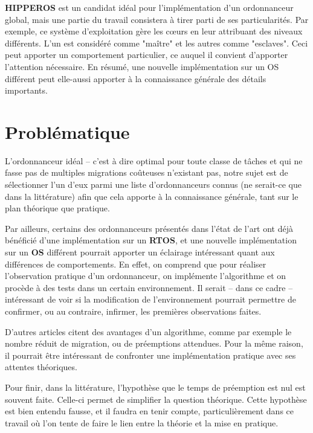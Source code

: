 \documentclass[11pt,a4paper,oneside]{report}
\begin{document}
	\textbf{HIPPEROS} est un candidat idéal pour l'implémentation d'un ordonnanceur 
	global, mais une partie du travail consistera à tirer parti de ses particularités. 
	Par exemple, ce système d'exploitation gère les c\oe{}urs en leur attribuant des 
	niveaux différents. L'un est considéré comme "maître" et les autres comme "esclaves". 
	Ceci peut apporter un comportement particulier, ce auquel il convient d'apporter 
	l'attention nécessaire. En résumé, une nouvelle implémentation sur un OS différent 
	peut elle-aussi apporter à la connaissance générale des détails importants.
	
	
	\section{Problématique}
	L'ordonnanceur idéal -- c'est à dire optimal pour toute classe de tâches et 
	qui ne fasse pas de multiples migrations coûteuses n'existant pas, 
	notre sujet est de sélectionner l'un d'eux parmi une liste 
	d'ordonnanceurs connus (ne serait-ce que dans la littérature) afin que cela apporte 
	à la connaissance générale, tant sur le plan théorique que pratique.\medskip
	
	Par ailleurs, certains des ordonnanceurs présentés dans l'état de l'art 
	ont déjà bénéficié d'une implémentation sur un \textbf{RTOS}, et une nouvelle 
	implémentation sur un \textbf{OS} différent pourrait apporter un éclairage intéressant quant 
	aux différences de comportements.
	En effet, on comprend que pour réaliser l'observation pratique d'un ordonnanceur, 
	on implémente l'algorithme et on procède à des tests dans un certain environnement. 
	Il serait -- dans ce cadre -- intéressant de voir si la modification de l'environnement 
	pourrait permettre de confirmer, ou au contraire, infirmer, les premières observations faites.
	
	
	D'autres articles citent des avantages d'un algorithme, comme par exemple 
	le nombre réduit de migration, ou de préemptions attendues. Pour la même raison, 
	il pourrait être intéressant de confronter une implémentation pratique avec ses attentes 
	théoriques.\medskip
	
	Pour finir, dans la littérature, l'hypothèse que le temps de préemption est nul 
	est souvent faite. Celle-ci permet de simplifier la question théorique. 
	Cette hypothèse est bien entendu fausse, et il faudra en tenir compte, 
	particulièrement dans ce travail où l'on tente de faire 
	le lien entre la théorie et la mise en pratique.\medskip
	
\end{document}
